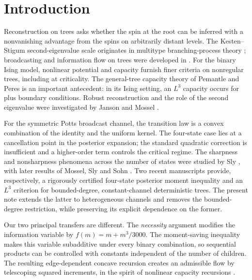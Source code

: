 \section{Introduction}\label{sec:intro}

Reconstruction on trees asks whether the spin at the root can be inferred
with a nonvanishing advantage from the spins on arbitrarily distant
levels. The Kesten--Stigum second-eigenvalue scale originates in
multitype branching-process theory \cite{KS66}; broadcasting and
information flow on trees were developed in
\cite{EKPS00,MP03}. For the binary Ising model, nonlinear potential
and capacity furnish finer criteria on nonregular trees, including at
criticality. The general-tree capacity theory of Pemantle and Peres
\cite{PP10} is an important antecedent: in its Ising setting, an
$L^3$ capacity occurs for plus boundary conditions. Robust
reconstruction and the role of the second eigenvalue were investigated
by Janson and Mossel \cite{JM04}.

For the symmetric Potts broadcast channel, the transition law is a
convex combination of the identity and the uniform kernel. The
four-state case lies at a cancellation point in the posterior
expansion; the standard quadratic correction is insufficient and a
higher-order term controls the critical regime. The sharpness and
nonsharpness phenomena across the number of states were studied by
Sly \cite{Sly11}, with later results of Mossel, Sly and Sohn
\cite{MSS25}. Two recent manuscripts \cite{OAIThreshold,OAICapacity}
provide, respectively, a rigorously certified four-state posterior
moment inequality and an $L^3$ criterion for bounded-degree,
constant-channel deterministic trees. The present note extends the
latter to heterogeneous channels and removes the bounded-degree
restriction, while preserving its explicit dependence on the former.

Our two principal transfers are different. The 
\emph{necessity} argument modifies the information variable by
$f(m)=m+m^3/3000$. The moment-saving inequality makes this variable
subadditive under every binary combination, so sequential products
can be controlled with constants independent of the number of
children. The resulting edge-dependent concave recursion creates an
admissible flow by telescoping squared increments, in the spirit of
nonlinear capacity recursions \cite{PP10}.

